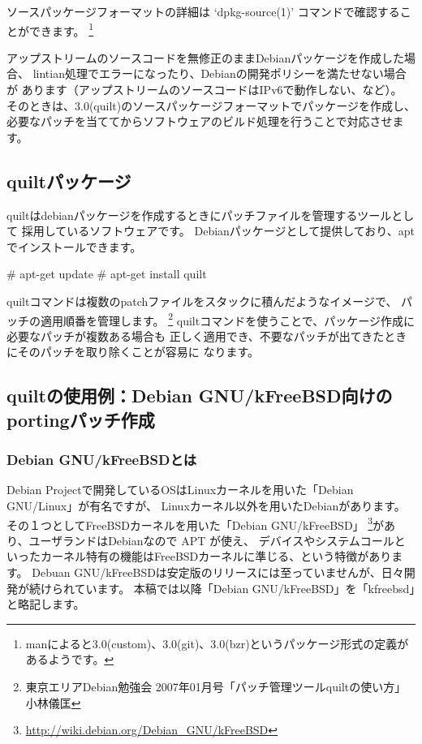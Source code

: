 \documentclass[mingoth,a4paper]{jsarticle}
\begin{document}
ソースパッケージフォーマットの詳細は `dpkg-source(1)' コマンドで確認することができます。
\footnote{manによると3.0(custom)、3.0(git)、3.0(bzr)というパッケージ形式の定義があるようです。}

アップストリームのソースコードを無修正のままDebianパッケージを作成した場合、
lintian処理でエラーになったり、Debianの開発ポリシーを満たせない場合が
あります（アップストリームのソースコードはIPv6で動作しない、など）。
そのときは、3.0(quilt)のソースパッケージフォーマットでパッケージを作成し、
必要なパッチを当ててからソフトウェアのビルド処理を行うことで対応させます。

\subsection{quiltパッケージ}
quiltはdebianパッケージを作成するときにパッチファイルを管理するツールとして
採用しているソフトウェアです。
Debianパッケージとして提供しており、aptでインストールできます。

\begin{commandline}
# apt-get update
# apt-get install quilt
\end{commandline}

quiltコマンドは複数のpatchファイルをスタックに積んだようなイメージで、
パッチの適用順番を管理します。
\footnote{東京エリアDebian勉強会 2007年01月号「パッチ管理ツールquiltの使い方」小林儀匡}
quiltコマンドを使うことで、パッケージ作成に必要なパッチが複数ある場合も
正しく適用でき、不要なパッチが出てきたときにそのパッチを取り除くことが容易に
なります。


\subsection{quiltの使用例：Debian GNU/kFreeBSD向けのportingパッチ作成}

\subsubsection{Debian GNU/kFreeBSDとは}
Debian Projectで開発しているOSはLinuxカーネルを用いた「Debian GNU/Linux」が有名ですが、
Linuxカーネル以外を用いたDebianがあります。その１つとしてFreeBSDカーネルを用いた「Debian GNU/kFreeBSD」
\footnote{\url{http://wiki.debian.org/Debian\_GNU/kFreeBSD}}があり、ユーザランドはDebianなので APT が使え、
デバイスやシステムコールといったカーネル特有の機能はFreeBSDカーネルに準じる、という特徴があります。
Debuan GNU/kFreeBSDは安定版のリリースには至っていませんが、日々開発が続けられています。
本稿では以降「Debian GNU/kFreeBSD」を「kfreebsd」と略記します。
\end{document}
